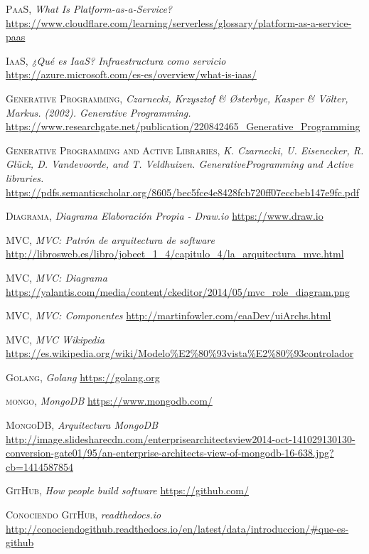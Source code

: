 \documentclass[a4paper,11pt]{book}
\begin{document}
\begin{thebibliography}{}
 \textsc{PaaS},
\textit{What Is Platform-as-a-Service?}
\url{https://www.cloudflare.com/learning/serverless/glossary/platform-as-a-service-paas} 

 \textsc{IaaS},
\textit{¿Qué es IaaS? Infraestructura como servicio}
\url{https://azure.microsoft.com/es-es/overview/what-is-iaas/} 


 \textsc{Generative Programming},
\textit{Czarnecki, Krzysztof \&  Østerbye, Kasper \& Völter, Markus. (2002). Generative Programming.}
\url{https://www.researchgate.net/publication/220842465_Generative_Programming} 


 \textsc{Generative Programming and Active Libraries},
\textit{K. Czarnecki, U. Eisenecker, R. Glück, D. Vandevoorde, and T. Veldhuizen. GenerativeProgramming and Active libraries.}
\url{https://pdfs.semanticscholar.org/8605/bec5fce4e8428fcb720ff07eccbeb147e9fc.pdf} 

 \textsc{Diagrama},
\textit{Diagrama Elaboración Propia - Draw.io}
\url{https://www.draw.io}

 \textsc{MVC},
\textit{MVC: Patrón de arquitectura de software }
\url{http://librosweb.es/libro/jobeet_1_4/capitulo_4/la_arquitectura_mvc.html}

 \textsc{MVC},
\textit{MVC: Diagrama}
\url{https://yalantis.com/media/content/ckeditor/2014/05/mvc_role_diagram.png}

 \textsc{MVC},
\textit{MVC: Componentes}
\url{http://martinfowler.com/eaaDev/uiArchs.html}

 \textsc{MVC},
\textit{MVC Wikipedia}
\url{https://es.wikipedia.org/wiki/Modelo%E2%80%93vista%E2%80%93controlador}


 \textsc{Golang},
\textit{Golang}
\url{https://golang.org}

 \textsc{mongo},
\textit{MongoDB}
\url{https://www.mongodb.com/}

 \textsc{MongoDB},
\textit{Arquitectura MongoDB}
\url{http://image.slidesharecdn.com/enterprisearchitectsview2014-oct-141029130130-conversion-gate01/95/an-enterprise-architects-view-of-mongodb-16-638.jpg?cb=1414587854}


 \textsc{GitHub},
\textit{How people build software}
\url{https://github.com/}


 \textsc{Conociendo GitHub},
\textit{readthedocs.io }
\url{http://conociendogithub.readthedocs.io/en/latest/data/introduccion/#que-es-github}


\end{thebibliography}
\end{document}
